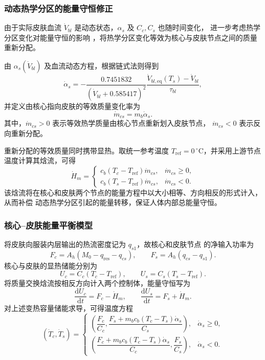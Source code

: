 \documentclass[withoutpreface,bwprint]{cumcmthesis}
\begin{document}
\subsubsection{动态热学分区的能量守恒修正}
由于实际皮肤血流 $\dot V_{bl}$ 是动态状态，$\alpha_s$ 及 $C_c,C_s$ 也随时间变化，
进一步考虑热学分区变化对能量守恒的影响
，将热学分区变化等效为核心与皮肤节点之间的质量重新分配。

由 $\alpha_s(\dot V_{bl})$ 及血流动态方程，根据链式法则得到
\[
\dot\alpha_s
=-\frac{0.7451832}{(\dot V_{bl}+0.585417)^2}
\frac{\dot V_{bl,\mathrm{eq}}(T_s)-\dot V_{bl}}{\tau_{bl}},
\]
并定义由核心指向皮肤的等效质量变化率为
\[
\dot m_{cs}=m_b\dot\alpha_s.
\]
其中，$\dot m_{cs}>0$ 表示等效热学质量由核心节点重新划入皮肤节点，
$\dot m_{cs}<0$ 表示反向重新分配。

重新分配的等效质量同时携带显热。取统一参考温度
$T_{\mathrm{ref}}=0\,^{\circ}\mathrm C$，并采用上游节点温度计算其焓流，可得
\[
\dot H_m=
\begin{cases}
c_b(T_c-T_{\mathrm{ref}})\dot m_{cs},&\dot m_{cs}\geq0,\\[4pt]
c_b(T_s-T_{\mathrm{ref}})\dot m_{cs},&\dot m_{cs}<0.
\end{cases}
\]
该焓流将在核心和皮肤两个节点的能量方程中以大小相等、方向相反的形式计入，从而补偿
动态热学分区引起的能量转移，保证人体内部总能量守恒。

\subsubsection{核心--皮肤能量平衡模型}

将皮肤向服装内层输出的热流密度记为 $q_{s1}$，故核心和皮肤节点
的净输入功率为
\[
F_c=A_h(M_0-q_{\mathrm{res}}-q_{cs}),\qquad
F_s=A_h(q_{cs}-q_{s1}).
\]
核心与皮肤的显热储能分别为
\[
U_c=C_c(T_c-T_{\mathrm{ref}}),\qquad
U_s=C_s(T_s-T_{\mathrm{ref}}).
\]
将质量交换焓流按相反方向计入两个控制体，能量守恒写为
\[
\frac{\mathrm dU_c}{\mathrm dt}=F_c-\dot H_m,\qquad
\frac{\mathrm dU_s}{\mathrm dt}=F_s+\dot H_m.
\]
对上述变热容量储能求导，可得温度方程
\begin{equation}
(\dot T_c,\dot T_s)=
\begin{cases}
\left(
\dfrac{F_c}{C_c},
\dfrac{F_s+m_bc_b(T_c-T_s)\dot\alpha_s}{C_s}
\right),&\dot\alpha_s\geq0,\\[10pt]
\left(
\dfrac{F_c+m_bc_b(T_c-T_s)\dot\alpha_s}{C_c},
\dfrac{F_s}{C_s}
\right),&\dot\alpha_s<0.
\end{cases}
\label{eq:q1-human-temperature-balance}
\end{equation}
\end{document}
